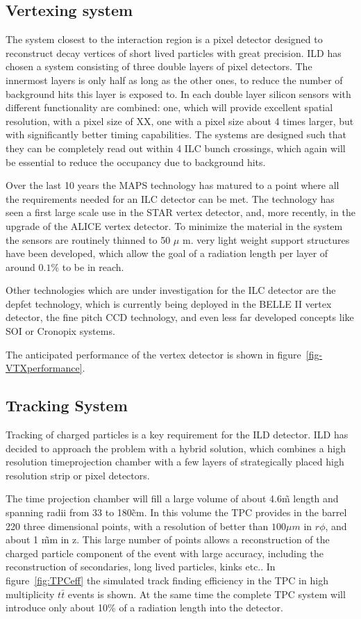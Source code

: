 \documentclass[%
 amsmath,amssymb,
 aps,
]{revtex4-1}
\begin{document}
 
\subsection{Vertexing system}
The system closest to the interaction region is a pixel detector designed to reconstruct decay vertices of short lived particles with great precision. ILD has chosen a system consisting of three double layers of pixel detectors. The innermost layers is only half as long as the other ones, to reduce the number of background hits this layer is exposed to. In each double layer silicon sensors with different functionality are combined: one, which will provide excellent spatial resolution, with a pixel size of XX, one with a pixel size about 4 times larger, but with significantly better timing capabilities. The systems are designed such that they can be completely read out within 4 ILC bunch crossings, which again will be essential to reduce the occupancy due to background hits. 

Over the last 10 years the MAPS technology has matured to a point where all the requirements needed for an ILC detector can be met. The technology has seen a first large scale use in the STAR vertex detector, and, more recently, in the upgrade of the ALICE vertex detector. To minimize the material in the system the sensors are routinely thinned to 50 $\mu$ m. very light weight support structures have been developed, which allow the goal of a radiation length per layer of around $0.1 \%$ to be in reach. 

Other technologies which are under investigation for the ILC detector are the depfet technology, which is currently being deployed in the BELLE II vertex detector, the fine pitch CCD technology, and even less far developed concepts like SOI or Cronopix systems. 

The anticipated performance of the vertex detector is shown in figure~\ref{fig-VTXperformance}.  

\subsection{Tracking System}

Tracking of charged particles is a key requirement for the ILD detector. ILD has decided to approach the problem with a hybrid solution, which combines a high resolution timeprojection chamber with a few layers of strategically placed high resolution strip or pixel detectors. 

The time projection chamber will fill a large volume of about 4.6\~m length and spanning radii from 33 to 180\~cm. In this volume the TPC provides in the barrel 220 three dimensional points, with a resolution of better than $100 \mu m$ in $r \phi$, and about 1 \~mm in z. This large number of points allows a reconstruction of the charged particle component of the event with large accuracy, including the reconstruction of secondaries, long lived particles, kinks etc.. In figure~\ref{fig:TPCeff} the simulated track finding efficiency in the TPC in high multiplicity $t \bar t$ events is shown. At the same time the complete TPC system will introduce only about 10\% of a radiation length into the detector. 
\end{document}
